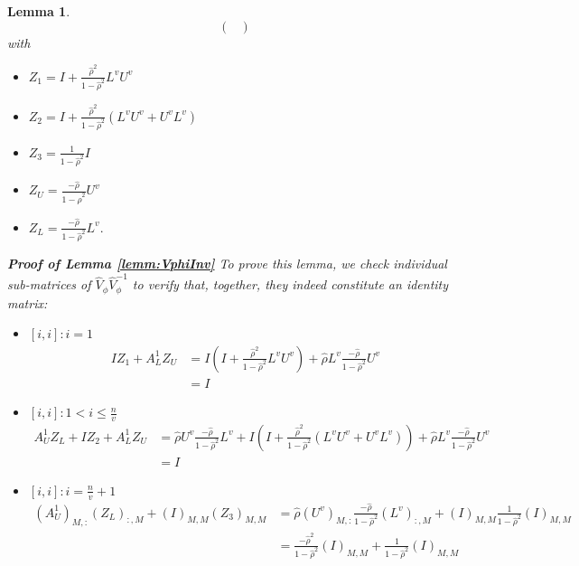 \documentclass[11pt,dvipsnames]{article}
\newtheorem{lemma}{Lemma}
\begin{document}
\begin{appendices}
\begin{lemma}
\begin{equation}
\begin{pmatrix}
\end{pmatrix}
\end{equation}
with
\begin{itemize}
\item $ Z_{1}=I+\frac{\hat{\rho}^{2}}{1-\hat{\rho}^{2}}L^{v}U^{v} $
\item $ Z_{2}=I+\frac{\hat{\rho}^{2}}{1-\hat{\rho}^{2}}\left( L^{v}U^{v}+U^{v}L^{v}\right)$
\item $ Z_{3} =\frac{1}{1-\hat{\rho}^{2}} I  $
\item $ Z_{U} =\frac{-\hat{\rho}}{1-\hat{\rho}^{2}} U^{v}  $
\item $ Z_{L} =\frac{-\hat{\rho}}{1-\hat{\rho}^{2}} L^{v}. $
\end{itemize}
\textbf{\textup{Proof of Lemma \ref{lemm:VphiInv}}}
To prove this lemma, we check individual sub-matrices of $ \widehat{V}_{\phi}\widehat{V}_{\phi}^{-1} $ to verify that, together, they indeed constitute an identity matrix:
\begin{itemize}
\item $ [i,i]: i=1 $
\begin{equation}
\begin{split}
IZ_{1}+A_{L}^{1}Z_{U}&=I\left( I+\frac{\hat{\rho}^{2}}{1-\hat{\rho}^{2}}L^{v}U^{v} \right) + \hat{\rho} L^{v}\frac{-\hat{\rho}}{1-\hat{\rho}^{2}} U^{v}\\
&=I
\end{split}
\end{equation}
\item $ [i,i]: 1 < i \leq \frac{n}{v} $
\begin{equation}
\begin{split}
A_{U}^{1}Z_{L} +IZ_{2}+A_{L}^{1}Z_{U}&=\hat{\rho} U^{v}\frac{-\hat{\rho}}{1-\hat{\rho}^{2}} L^{v}+I\left( I+\frac{\hat{\rho}^{2}}{1-\hat{\rho}^{2}}\left( L^{v}U^{v}+U^{v}L^{v}\right)\right)+ \hat{\rho} L^{v}\frac{-\hat{\rho}}{1-\hat{\rho}^{2}} U^{v}\\
&=I
\end{split}
\end{equation}
\item $ [i,i]: i=\frac{n}{v}+1 $
\begin{equation}
\begin{split}
(A_{U}^{1})_{M,:}(Z_{L})_{:,M}  +  (I)_{M,M}(Z_{3})_{M,M}&=\hat{\rho}( U^{v})_{M,:}\frac{-\hat{\rho}}{1-\hat{\rho}^{2}} (L^{v})_{:,M}  +  (I)_{M,M}\frac{1}{1-\hat{\rho}^{2}} (I)_{M,M}\\
&=\frac{-\hat{\rho}^{2}}{1-\hat{\rho}^{2}}(I)_{M,M}+\frac{1}{1-\hat{\rho}^{2}} (I)_{M,M}\\

\end{split}
\end{equation}
\end{itemize}
\end{lemma}
\end{appendices}
\end{document}
